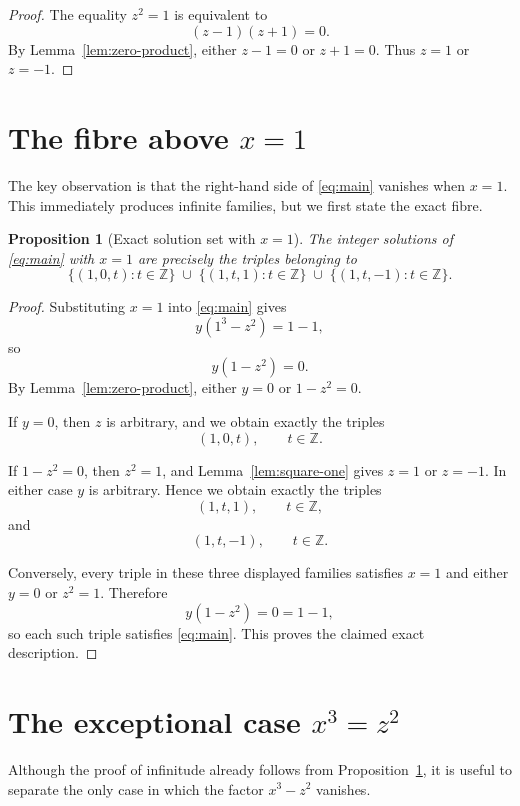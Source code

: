 \documentclass[11pt]{article}
\newtheorem{proposition}{Proposition}
\begin{document}
\begin{proof}
The equality \(z^2=1\) is equivalent to
\[
    (z-1)(z+1)=0.
\]
By Lemma~\ref{lem:zero-product}, either \(z-1=0\) or \(z+1=0\).  Thus \(z=1\) or \(z=-1\).
\end{proof}

\section{The fibre above \(x=1\)}

The key observation is that the right-hand side of \eqref{eq:main} vanishes when \(x=1\).  This immediately produces infinite families, but we first state the exact fibre.

\begin{proposition}[Exact solution set with \(x=1\)]\label{prop:fibre-x-one}
The integer solutions of \eqref{eq:main} with \(x=1\) are precisely the triples belonging to
\[
    \{(1,0,t):t\in\mathbb Z\}
    \;\cup\;
    \{(1,t,1):t\in\mathbb Z\}
    \;\cup\;
    \{(1,t,-1):t\in\mathbb Z\}.
\]
\end{proposition}

\begin{proof}
Substituting \(x=1\) into \eqref{eq:main} gives
\[
    y(1^3-z^2)=1-1,
\]
so
\[
    y(1-z^2)=0.
\]
By Lemma~\ref{lem:zero-product}, either \(y=0\) or \(1-z^2=0\).

If \(y=0\), then \(z\) is arbitrary, and we obtain exactly the triples
\[
    (1,0,t),\qquad t\in\mathbb Z.
\]

If \(1-z^2=0\), then \(z^2=1\), and Lemma~\ref{lem:square-one} gives \(z=1\) or \(z=-1\).  In either case \(y\) is arbitrary.  Hence we obtain exactly the triples
\[
    (1,t,1),\qquad t\in\mathbb Z,
\]
and
\[
    (1,t,-1),\qquad t\in\mathbb Z.
\]

Conversely, every triple in these three displayed families satisfies \(x=1\) and either \(y=0\) or \(z^2=1\).  Therefore
\[
    y(1-z^2)=0=1-1,
\]
so each such triple satisfies \eqref{eq:main}.  This proves the claimed exact description.
\end{proof}

\section{The exceptional case \(x^3=z^2\)}

Although the proof of infinitude already follows from Proposition~\ref{prop:fibre-x-one}, it is useful to separate the only case in which the factor \(x^3-z^2\) vanishes.
\end{document}
